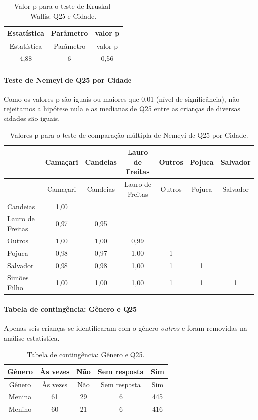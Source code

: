 \documentclass[]{article}
\let\oldparagraph\paragraph
\renewcommand{\paragraph}[1]{\oldparagraph{#1}\mbox{}}
\begin{document}
\begin{longtable}[]{@{}ccc@{}}
\caption{\label{tab:unnamed-chunk-668}Valor-p para o teste de Kruskal-Wallis: Q25 e Cidade.}\tabularnewline
\toprule
Estatística & Parâmetro & valor p\tabularnewline
\midrule
\endfirsthead
\toprule
Estatística & Parâmetro & valor p\tabularnewline
\midrule
\endhead
4,88 & 6 & 0,56\tabularnewline
\bottomrule
\end{longtable}

\hypertarget{teste-de-nemeyi-de-q25-por-cidade}{%
\paragraph{Teste de Nemeyi de Q25 por Cidade}\label{teste-de-nemeyi-de-q25-por-cidade}}

Como os valores-p são iguais ou maiores que 0.01 (nível de significância), não rejeitamos a hipótese nula e as medianas de Q25 entre as crianças de diversas cidades são iguais.

\begin{longtable}[]{@{}lcccccc@{}}
\caption{\label{tab:unnamed-chunk-670}Valores-p para o teste de comparação múltipla de Nemeyi de Q25 por Cidade.}\tabularnewline
\toprule
& Camaçari & Candeias & Lauro de Freitas & Outros & Pojuca & Salvador\tabularnewline
\midrule
\endfirsthead
\toprule
& Camaçari & Candeias & Lauro de Freitas & Outros & Pojuca & Salvador\tabularnewline
\midrule
\endhead
Candeias & 1,00 & & & & &\tabularnewline
Lauro de Freitas & 0,97 & 0,95 & & & &\tabularnewline
Outros & 1,00 & 1,00 & 0,99 & & &\tabularnewline
Pojuca & 0,98 & 0,97 & 1,00 & 1 & &\tabularnewline
Salvador & 0,98 & 0,98 & 1,00 & 1 & 1 &\tabularnewline
Simões Filho & 1,00 & 1,00 & 1,00 & 1 & 1 & 1\tabularnewline
\bottomrule
\end{longtable}

\cleardoublepage

\hypertarget{tabela-de-continguxeancia-guxeanero-e-q25}{%
\paragraph{Tabela de contingência: Gênero e Q25}\label{tabela-de-continguxeancia-guxeanero-e-q25}}

Apenas seis crianças se identificaram com o gênero \emph{outros} e foram removidas na análise estatística.

\begin{longtable}[]{@{}ccccc@{}}
\caption{\label{tab:unnamed-chunk-671}Tabela de contingência: Gênero e Q25.}\tabularnewline
\toprule
Gênero & Às vezes & Não & Sem resposta & Sim\tabularnewline
\midrule
\endfirsthead
\toprule
Gênero & Às vezes & Não & Sem resposta & Sim\tabularnewline
\midrule
\endhead
Menina & 61 & 29 & 6 & 445\tabularnewline
Menino & 60 & 21 & 6 & 416\tabularnewline
\bottomrule
\end{longtable}
\end{document}
